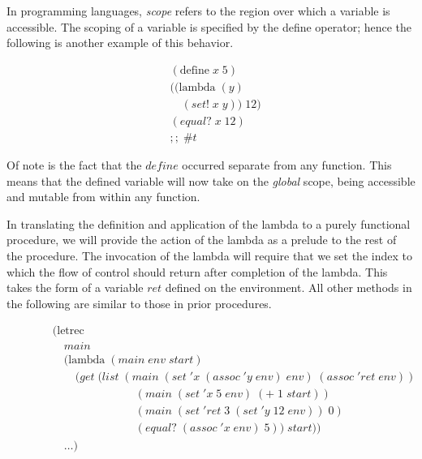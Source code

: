 In programming languages, \emph{scope} refers to the region over which a variable is
accessible. The scoping of a variable is specified by the define operator; hence the 
following is another example of this behavior.

\begin{figure}[ht]
\caption{}\label{scheme}
\begin{align*}
& (\text{define} \; x \; 5)
\\& ((\text{lambda} \; (y)
\\& \quad (set! \; x \; y)) \; 12)
\\& (equal? \; x \; 12) \; 
\\& ;; \; \#t
\end{align*}
\end{figure}

Of note is the fact that the $define$ occurred separate from any function. This 
means that the defined variable will now take on the \emph{global} scope, being accessible 
and mutable from within any function. 

In translating the definition and application of the lambda to a purely functional
procedure, we will provide the action of the lambda as a prelude to the rest of the 
procedure. The invocation of the lambda will require that we set the index to which
the flow of control should return after completion of the lambda. This takes the form
of a variable $ret$ defined on the environment. All other methods in the following are
similar to those in prior procedures.

\begin{figure}[ht]
\caption{}\label{scheme}
\begin{align*}
& (\text{letrec} \; 
\\& \quad main \; 
\\& \quad (\text{lambda} \; (main \; env \; start)
\\& \qquad (get \; (list \; (main \; (set \; 'x \; (assoc \; 'y \; env) \; env) \; (assoc \; 'ret \; env))
\\& \qquad \qquad \qquad \quad \; (main \; (set \; 'x \; 5 \; env) \; (+ \; 1 \; start))
\\& \qquad \qquad \qquad \quad \; (main \; (set \; 'ret \; 3 \; (set \; 'y \; 12 \; env)) \; 0)
\\& \qquad \qquad \qquad \quad \; (equal? \; (assoc \; 'x \; env) \; 5)) \; start))
\\& \quad \dots)
\end{align*}
\end{figure}

